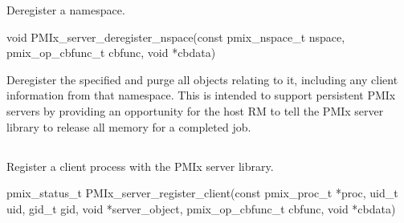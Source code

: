 \summary

Deregister a namespace.

\format

\cspecificstart
\begin{codepar}
void PMIx_server_deregister_nspace(const pmix_nspace_t nspace,
                        pmix_op_cbfunc_t cbfunc, void *cbdata)
\end{codepar}
\cspecificend

\begin{arglist}
\end{arglist}

\descr

Deregister the specified  and purge all objects relating to it, including any client information from that namespace.
This is intended to support persistent \ac{PMIx} servers by providing an opportunity for the host \ac{RM} to tell the \ac{PMIx} server library to release all memory for a completed job.



\subsection{}

\summary

Register a client process with the PMIx server library.

\format

\cspecificstart
\begin{codepar}
pmix_status_t
PMIx_server_register_client(const pmix_proc_t *proc,
                        uid_t uid, gid_t gid,
                        void *server_object,
                        pmix_op_cbfunc_t cbfunc, void *cbdata)
\end{codepar}
\cspecificend

\begin{arglist}
\end{arglist}

